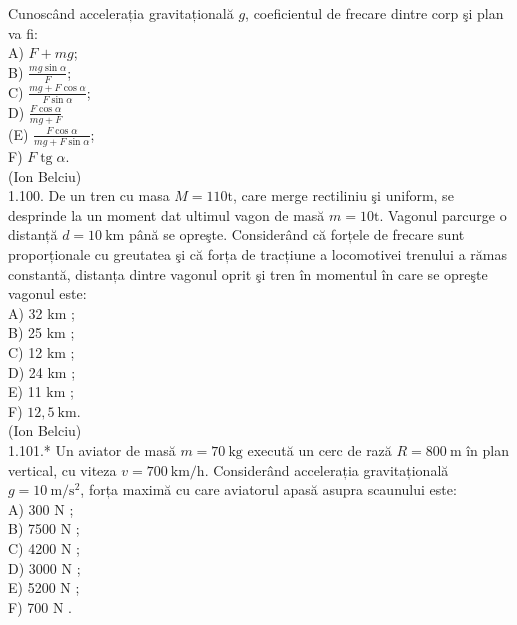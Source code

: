 \documentclass[10pt]{article}
\begin{document}
Cunoscând accelerația gravitațională $g$, coeficientul de frecare dintre corp şi plan va fi:\\
A) $F+m g$;\\
B) $\frac{m g \sin \alpha}{F}$;\\
C) $\frac{m g+F \cos \alpha}{F \sin \alpha}$;\\
D) $\frac{F \cos \alpha}{m g+F}$\\
(E) $\frac{F \cos \alpha}{m g+F \sin \alpha}$;\\
F) $F \operatorname{tg} \alpha$.\\
(Ion Belciu)\\
1.100. De un tren cu masa $M=110 \mathrm{t}$, care merge rectiliniu şi uniform, se desprinde la un moment dat ultimul vagon de masă $m=10 \mathrm{t}$. Vagonul parcurge o distanță $d=10 \mathrm{~km}$ până se opreşte. Considerând că forțele de frecare sunt proporționale cu greutatea şi că forța de tracțiune a locomotivei trenului a rămas constantă, distanța dintre vagonul oprit şi tren în momentul în care se opreşte vagonul este:\\
A) 32 km ;\\
B) 25 km ;\\
C) 12 km ;\\
D) 24 km ;\\
E) 11 km ;\\
F) $12,5 \mathrm{~km}$.\\
(Ion Belciu)\\
1.101.* Un aviator de masă $m=70 \mathrm{~kg}$ execută un cerc de rază $R=800 \mathrm{~m}$ în plan vertical, cu viteza $v=700 \mathrm{~km} / \mathrm{h}$. Considerând accelerația gravitațională $g=10 \mathrm{~m} / \mathrm{s}^{2}$, forța maximă cu care aviatorul apasă asupra scaunului este:\\
A) 300 N ;\\
B) 7500 N ;\\
C) 4200 N ;\\
D) 3000 N ;\\
E) 5200 N ;\\
F) 700 N .
\end{document}
